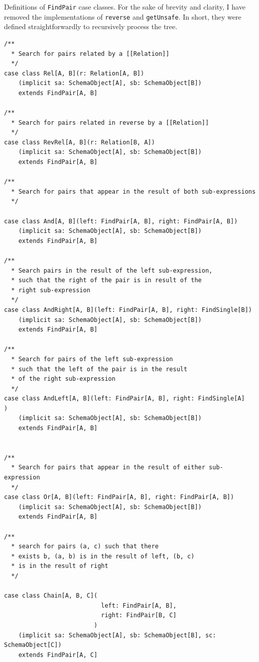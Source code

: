 \documentclass[12pt,a4paper,twoside,openright]{report}
\newcommand\codeName[1]{\texttt{#1}}
\renewcommand{\baselinestretch}{1.1}    %
\begin{document}
Definitions of \codeName{FindPair} case classes.
For the sake of brevity and clarity, I have removed the implementations of \codeName{reverse} and \codeName{getUnsafe}. In short, they were defined straightforwardly to recursively process the tree.
\renewcommand{\baselinestretch}{0.8}
\begin{framed}
\begin{verbatim}
/**
  * Search for pairs related by a [[Relation]]
  */
case class Rel[A, B](r: Relation[A, B])
    (implicit sa: SchemaObject[A], sb: SchemaObject[B])
    extends FindPair[A, B]

/**
  * Search for pairs related in reverse by a [[Relation]]
  */
case class RevRel[A, B](r: Relation[B, A])
    (implicit sa: SchemaObject[A], sb: SchemaObject[B])
    extends FindPair[A, B]

/**
  * Search for pairs that appear in the result of both sub-expressions
  */

case class And[A, B](left: FindPair[A, B], right: FindPair[A, B])
    (implicit sa: SchemaObject[A], sb: SchemaObject[B])
    extends FindPair[A, B]

/**
  * Search pairs in the result of the left sub-expression,
  * such that the right of the pair is in result of the
  * right sub-expression
  */
case class AndRight[A, B](left: FindPair[A, B], right: FindSingle[B])
    (implicit sa: SchemaObject[A], sb: SchemaObject[B])
    extends FindPair[A, B]

/**
  * Search for pairs of the left sub-expression
  * such that the left of the pair is in the result
  * of the right sub-expression
  */
case class AndLeft[A, B](left: FindPair[A, B], right: FindSingle[A]                        )
    (implicit sa: SchemaObject[A], sb: SchemaObject[B])
    extends FindPair[A, B]


/**
  * Search for pairs that appear in the result of either sub-expression
  */
case class Or[A, B](left: FindPair[A, B], right: FindPair[A, B])
    (implicit sa: SchemaObject[A], sb: SchemaObject[B])
    extends FindPair[A, B]

/**
  * search for pairs (a, c) such that there
  * exists b, (a, b) is in the result of left, (b, c)
  * is in the result of right
  */

case class Chain[A, B, C](
                           left: FindPair[A, B],
                           right: FindPair[B, C]
                         )
    (implicit sa: SchemaObject[A], sb: SchemaObject[B], sc: SchemaObject[C])
    extends FindPair[A, C]


\end{verbatim}
\end{framed}
\end{document}
